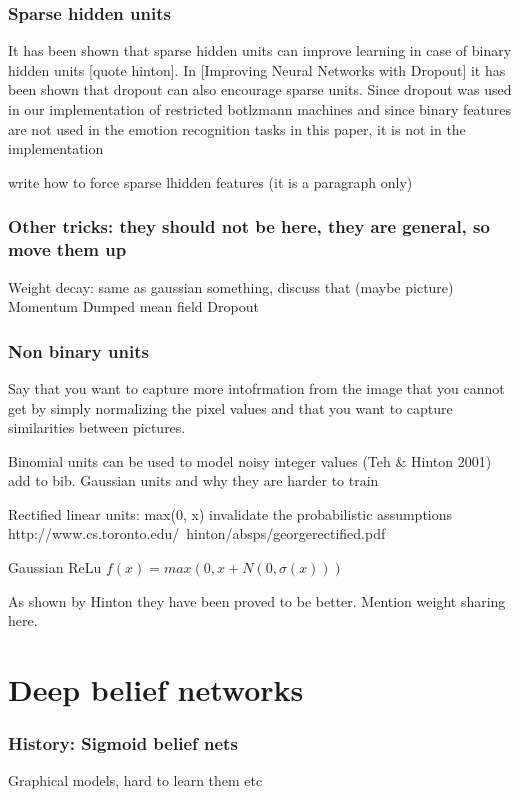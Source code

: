 \documentclass[11pt, fleqn, twoside]{article}
\begin{document}
\subsubsection{ Sparse hidden units}

  It has been shown that sparse hidden units can improve learning in case of binary hidden units [quote hinton]. In [Improving Neural Networks with Dropout] it has been shown that dropout can also encourage sparse units. Since dropout was used in our implementation of restricted botlzmann machines and since binary features are not used in the emotion recognition tasks in this paper, it is not in the implementation

  write how to force sparse lhidden features (it is a paragraph only)

\subsubsection{ Other tricks: they should not be here, they are general, so move them up}

  Weight decay: same as gaussian something, discuss that (maybe picture)
  Momentum
  Dumped mean field
  Dropout


\subsubsection{ Non binary units}
  Say  that you want to capture more intofrmation from the image that you cannot get by simply normalizing the pixel values and that you want to capture similarities between pictures.

  Binomial units can be used to model noisy integer values (Teh \& Hinton 2001) add to bib.
  Gaussian units and why they are harder to train

  Rectified linear units: max(0, x) invalidate the probabilistic assumptions
  http://www.cs.toronto.edu/~hinton/absps/georgerectified.pdf

  Gaussian ReLu
  $f(x) = max(0, x + N(0, \sigma(x)))$

  As shown by Hinton they have been proved to be better.
  Mention weight sharing here.

\section{ Deep belief networks}

\subsubsection{ History: Sigmoid belief nets}
  Graphical models, hard to learn them etc
\end{document}
